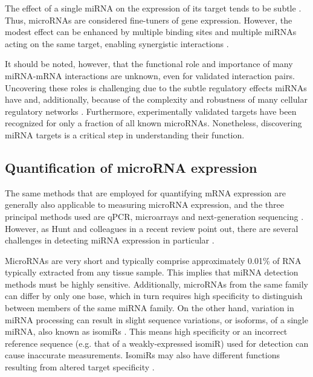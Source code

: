 The effect of a single miRNA on the expression of
its target tends to be subtle \citep{Baek2008}. Thus, microRNAs are considered
fine-tuners of gene expression. However, the modest effect can be enhanced by
multiple binding sites and multiple miRNAs acting on the same target, enabling
synergistic interactions \citep{Bartel2009}.


It should be noted, however, that the functional role and importance of many
miRNA-mRNA interactions are unknown, even for validated interaction pairs.
Uncovering these roles is challenging due to the subtle regulatory effects
miRNAs have and, additionally, because of the complexity and robustness of
many cellular regulatory networks \citep{Bartel2009}. Furthermore,
experimentally validated targets have been recognized for only a fraction of
all known microRNAs. Nonetheless, discovering miRNA targets is a critical step
in understanding their function.




\subsection{Quantification of microRNA expression}

The same methods that are employed for quantifying mRNA expression are generally
also applicable to measuring microRNA expression, and the three principal methods
used are qPCR, microarrays and next-generation sequencing
\citep{Huang2011}. However, as Hunt and colleagues in a recent review point
out, there are several challenges in detecting miRNA expression in particular
\citep{Hunt2015}.

MicroRNAs are very short and typically comprise approximately 0.01\% of RNA
typically extracted from any tissue sample. This implies that
miRNA detection methods must be highly sensitive. Additionally, microRNAs from
the same family can differ by only one base, which in turn requires high
specificity to distinguish between members of the same miRNA family. On the
other hand, variation in miRNA processing can result in slight sequence
variations, or isoforms, of a single miRNA, also known as isomiRs
\citep{Lee2010}. This means high specificity or an incorrect
reference sequence (e.g. that of a weakly-expressed isomiR) used for detection
can cause inaccurate measurements. IsomiRs may also have different functions
resulting from altered target specificity \citep{Chugh2012}.

